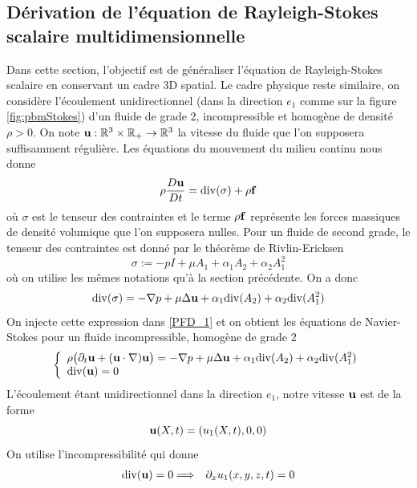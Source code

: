 \subsection{Dérivation de l'équation de Rayleigh-Stokes scalaire multidimensionnelle}\label{RS_scalaire}
Dans cette section, l'objectif est de généraliser l'équation de Rayleigh-Stokes scalaire en conservant un cadre $3$D spatial. Le cadre physique reste similaire, on considère l'écoulement unidirectionnel (dans la direction $e_1$ comme sur la figure \ref{fig:pbmStokes}) d'un fluide de grade $2$, incompressible et homogène de densité $\rho>0$. On note $\bm{\mathrm{u}} : \mathbb{R}^3 \times \mathbb{R}_+ \rightarrow \mathbb{R}^3$ la vitesse du fluide que l'on supposera suffisamment régulière. Les équations du mouvement du milieu continu nous donne 
\begin{equation}\label{PFD_1}
    \rho \frac{D\bm{\mathrm{u}}}{Dt} = \mathrm{div}(\sigma) + \rho \bm{\mathrm{f}}
\end{equation}
où $\sigma$ est le tenseur des contraintes et le terme $\rho \bm{\mathrm{f}}$ représente les forces massiques de densité volumique que l'on supposera nulles. Pour un fluide de second grade, le tenseur des contraintes est donné par le théorème de Rivlin-Ericksen 
\begin{equation*}
    \sigma := -pI + \mu A_1 + \alpha_1 A_2 + \alpha_2 A_1^2
\end{equation*}
où on utilise les mêmes notations qu'à la section précédente. On a donc 
\begin{eqnarray*}
    \mathrm{div}(\sigma) = -\nabla p + \mu \Delta \bm{\mathrm{u}} + \alpha_1\mathrm{div}(A_2) + \alpha_2\mathrm{div}(A_1^2)
\end{eqnarray*}
On injecte cette expression dans \eqref{PFD_1} et on obtient les équations de Navier-Stokes pour un fluide incompressible, homogène de grade $2$
\begin{equation}\label{NS_gen}
    \left\{\begin{array}{l}
        \rho\big(\partial_t\bm{\mathrm{u}} + (\bm{\mathrm{u}} \cdot\nabla)\bm{\mathrm{u}}\big) = -\nabla p + \mu \Delta \bm{\mathrm{u}} + \alpha_1 \mathrm{div}(A_2) + \alpha_2 \mathrm{div}(A_1^2)  \\
        \mathrm{div}(\bm{\mathrm{u}}) = 0 
    \end{array}\right.
\end{equation}
L'écoulement étant unidirectionnel dans la direction $e_1$, notre vitesse $\bm{\mathrm{u}}$ est de la forme
\begin{equation*}
    \bm{\mathrm{u}}(X,t) = (u_1(X,t),0,0)
\end{equation*}
On utilise l'incompressibilité qui donne
\begin{eqnarray*}
    \mathrm{div}(\bm{\mathrm{u}}) = 0 &\Longrightarrow& \partial_xu_1(x,y,z,t) = 0
\end{eqnarray*}
